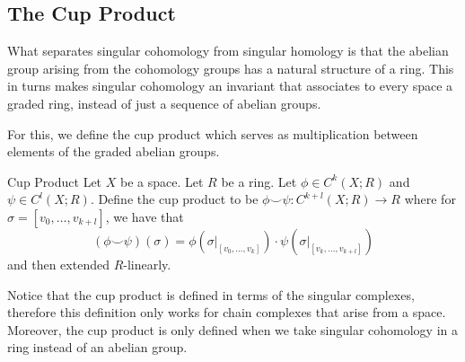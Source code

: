\documentclass[a4paper]{article}
\begin{document}
\subsection{The Cup Product}
What separates singular cohomology from singular homology is that the abelian group arising from the cohomology groups has a natural structure of a ring. This in turns makes singular cohomology an invariant that associates to every space a graded ring, instead of just a sequence of abelian groups. 

For this, we define the cup product which serves as multiplication between elements of the graded abelian groups. 

\begin{defn}{Cup Product}{} Let $X$ be a space. Let $R$ be a ring. Let $\phi\in C^k(X;R)$ and $\psi\in C^l(X;R)$. Define the cup product to be $\phi\smile\psi:C^{k+l}(X;R)\to R$ where for $\sigma=[v_0,\dots,v_{k+l}]$, we have that $$(\phi\smile\psi)(\sigma)=\phi(\sigma|_{[v_0,\dots,v_k]})\cdot\psi(\sigma|_{[v_k,\dots,v_{k+l}]})$$ and then extended $R$-linearly. 
\end{defn}

Notice that the cup product is defined in terms of the singular complexes, therefore this definition only works for chain complexes that arise from a space. Moreover, the cup product is only defined when we take singular cohomology in a ring instead of an abelian group. 
\end{document}
